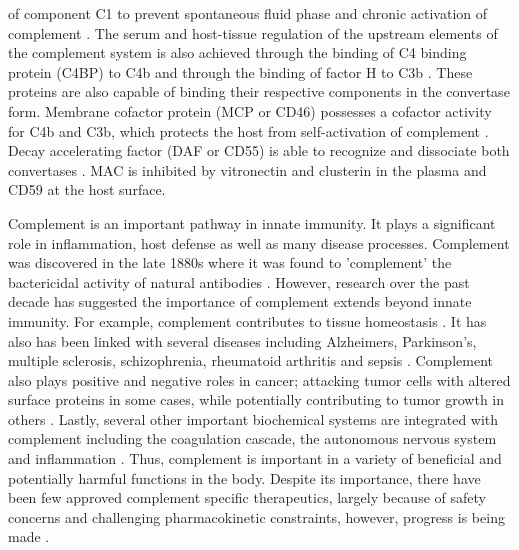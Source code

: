\documentclass[12pt]{article}
\begin{document}
of component C1 to prevent spontaneous fluid phase and chronic activation of complement \cite{walker1995complement}. The serum and host-tissue regulation of the upstream elements of the complement system is also achieved through the binding of C4 binding protein (C4BP) to C4b and through the binding of factor H to C3b \cite{blom2001structural}. These proteins are also capable of binding their respective components in the convertase form. Membrane cofactor protein (MCP or CD46) possesses a cofactor activity for C4b and C3b, which protects the host from self-activation of complement \cite{riley2004cd46}.  Decay accelerating factor (DAF or CD55) is able to recognize and dissociate both convertases \cite{lukacik2004complement}. MAC is inhibited by vitronectin and clusterin in the plasma and CD59 at the host surface.

Complement is an important pathway in innate immunity. It plays a significant role in inflammation, host defense as well as many disease processes.
Complement was discovered in the late 1880s where it was found to 'complement' the bactericidal activity of natural antibodies \cite{OG_COMPLEMENT_REF}.
However, research over the past decade has suggested the importance of complement extends beyond innate immunity.
For example, complement contributes to tissue homeostasis \cite{ricklin2010complement}.
It has also has been linked with several diseases including Alzheimers, Parkinson's, multiple sclerosis, schizophrenia, rheumatoid arthritis and sepsis \cite{ricklin2007complement, rittirsch2008harmful}.
Complement also plays positive and negative roles in cancer; attacking tumor cells with altered surface proteins in some cases, while potentially contributing to tumor growth in others \cite{sarma2011complement, ricklin2013complement}.
Lastly, several other important biochemical systems are integrated with complement including the coagulation cascade, the autonomous nervous system and inflammation \cite{ricklin2013complement}.
Thus, complement is important in a variety of beneficial and potentially harmful functions in the body.
Despite its importance, there have been few approved complement specific therapeutics,
largely because of safety concerns and challenging pharmacokinetic constraints, however, progress is being made \cite{Ricklin:2013aa}.
\end{document}
